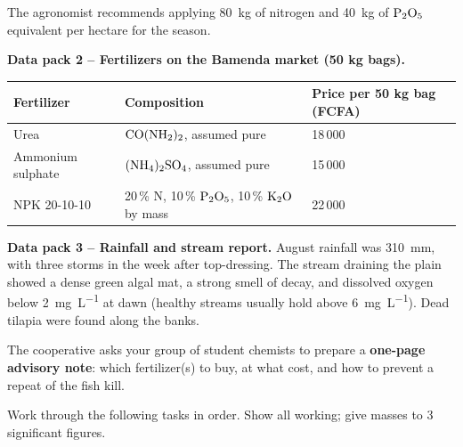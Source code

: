 \documentclass[11pt]{article}
\newcounter{popsec}
\newcounter{popsub}
\newcommand{\courssub}[1]{%
  \stepcounter{popsub}%
  \par\vspace{9pt}\noindent{\popxbold\fontsize{11.5}{13}\selectfont\color{popink}{\color{poporange}\thepopsec.\thepopsub}\hspace{6pt}#1}\par\nopagebreak\vspace{4pt}
}
\begin{document}
The agronomist recommends applying \SI{80}{kg} of nitrogen and \SI{40}{kg} of $\ce{P2O5}$ equivalent per hectare for the season.

\textbf{Data pack 2 -- Fertilizers on the Bamenda market (50 kg bags).}

\begin{center}
\begin{tabularx}{\linewidth}{|l|X|X|}
\hline
\rowcolor{popblueL} \textbf{Fertilizer} & \textbf{Composition} & \textbf{Price per 50 kg bag (FCFA)} \\
\hline
Urea & $\ce{CO(NH2)2}$, assumed pure & 18\,000 \\
\hline
Ammonium sulphate & $\ce{(NH4)2SO4}$, assumed pure & 15\,000 \\
\hline
NPK 20-10-10 & 20\,\% N, 10\,\% $\ce{P2O5}$, 10\,\% $\ce{K2O}$ by mass & 22\,000 \\
\hline
\end{tabularx}
\end{center}

\textbf{Data pack 3 -- Rainfall and stream report.} August rainfall was \SI{310}{mm}, with three storms in the week after top-dressing. The stream draining the plain showed a dense green algal mat, a strong smell of decay, and dissolved oxygen below \SI{2}{mg.L^{-1}} at dawn (healthy streams usually hold above \SI{6}{mg.L^{-1}}). Dead tilapia were found along the banks.

The cooperative asks your group of student chemists to prepare a \textbf{one-page advisory note}: which fertilizer(s) to buy, at what cost, and how to prevent a repeat of the fish kill.

\courssub{Tasks}

Work through the following tasks in order. Show all working; give masses to 3 significant figures.
\end{document}

